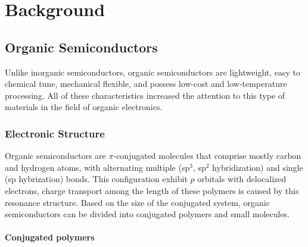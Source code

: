 \chapter{Background} \label{chap:background}

\section{Organic Semiconductors}

Unlike inorganic semiconductors, organic semiconductors are lightweight, easy to chemical tune, mechanical flexible, and possess low-cost and low-temperature processing. All of these characteristics increased the attention to this type of materials in the field of organic electronics. 


\subsection{Electronic Structure} 

Organic semiconductors are $\pi$-conjugated molecules that comprise mostly carbon and hydrogen atoms, with alternating multiple (sp$^{3}$, sp$^{2}$ hybridization) and single (sp hybrization) bonds. This configuration exhibit $p$ orbitals with delocalized electrons, charge transport among the length of these polymers is caused by this resonance structure. Based on the size of the conjugated system, organic semiconductors can be divided into conjugated polymers and small molecules.

\subsubsection{Conjugated polymers}

